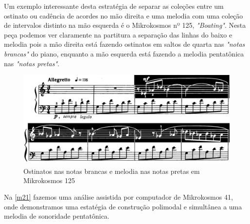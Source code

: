 \documentclass[
	12pt,				%
	openright,			%
	twoside,			%
	a4paper,			%
	english,			%
	french,				%
	spanish,			%
	brazil				%
	]{abntex2}
\begin{document}
\pagebreak
Um exemplo interessante desta estratégia de separar as coleções entre um ostinato ou cadência de acordes no mão direita e uma melodia com uma coleção de intervalos distinto na mão esquerda é o Mikrokosmos nº 125, \textit{"Boating"}. Nesta peça podemos ver claramente na partitura a separação das linhas do baixo e melodia pois a mão direita está fazendo ostinatos em saltos de quarta nas \textit{"notas brancas"} do piano, enquanto a mão esquerda está fazendo a melodia pentatônica nas \textit{"notas pretas"}. 

\begin{figure}[!h]
	\caption{\label{fig_grafico}Ostinatos nas notas brancas e melodia nas notas pretas em Mikrokosmos 125 }
	\begin{center}
	    \includegraphics[scale=0.45]{ostinatos/boating_ostinato.png}
	\end{center}
\end{figure}

Na \autoref{m21} fazemos uma análise assistida por computador de Mikrokosmos 41, onde demonstramos uma estatégia de construção polimodal e simultânea a uma melodia de sonoridade pentatônica.








%
%
%
\end{document}
